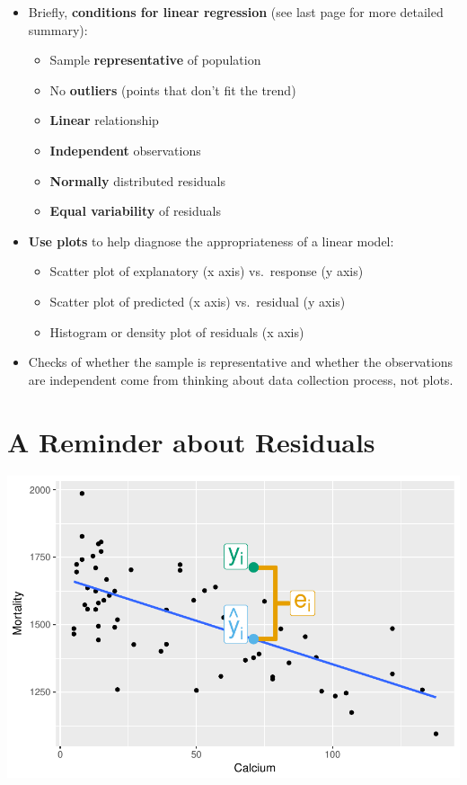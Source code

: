 \documentclass[]{article}
\providecommand{\tightlist}{%
  \setlength{\itemsep}{0pt}\setlength{\parskip}{0pt}}
\begin{document}
\begin{itemize}
\tightlist
\item
  Briefly, \textbf{conditions for linear regression} (see last page for
  more detailed summary):

  \begin{itemize}
  \tightlist
  \item
    Sample \textbf{representative} of population
  \item
    No \textbf{outliers} (points that don't fit the trend)
  \item
    \textbf{Linear} relationship
  \item
    \textbf{Independent} observations
  \item
    \textbf{Normally} distributed residuals
  \item
    \textbf{Equal variability} of residuals
  \end{itemize}
\item
  \textbf{Use plots} to help diagnose the appropriateness of a linear
  model:

  \begin{itemize}
  \tightlist
  \item
    Scatter plot of explanatory (x axis) vs.~response (y axis)
  \item
    Scatter plot of predicted (x axis) vs.~residual (y axis)
  \item
    Histogram or density plot of residuals (x axis)
  \end{itemize}
\item
  Checks of whether the sample is representative and whether the
  observations are independent come from thinking about data collection
  process, not plots.
\end{itemize}

\newpage

\section{A Reminder about Residuals}\label{a-reminder-about-residuals}

\includegraphics{20180417_anscombe_residuals_files/figure-latex/unnamed-chunk-2-1.pdf}
\end{document}
